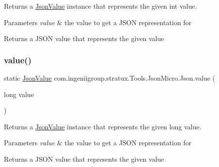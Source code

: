 Returns a \hyperlink{classcom_1_1ingeniigroup_1_1stratux_1_1_tools_1_1_json_micro_1_1_json_value}{Json\+Value} instance that represents the given {\ttfamily int} value.


\begin{DoxyParams}{Parameters}
{\em value} & the value to get a J\+S\+ON representation for \\
\hline
\end{DoxyParams}
\begin{DoxyReturn}{Returns}
a J\+S\+ON value that represents the given value 
\end{DoxyReturn}
\mbox{\label{classcom_1_1ingeniigroup_1_1stratux_1_1_tools_1_1_json_micro_1_1_json_af2c5388580e7dc541af4a3ca8e1a86f2}} 
\subsubsection{\texorpdfstring{value()}{value()}\hspace{0.1cm}{\footnotesize\ttfamily [2/6]}}
{\footnotesize\ttfamily static \hyperlink{classcom_1_1ingeniigroup_1_1stratux_1_1_tools_1_1_json_micro_1_1_json_value}{Json\+Value} com.\+ingeniigroup.\+stratux.\+Tools.\+Json\+Micro.\+Json.\+value (\begin{DoxyParamCaption}\item[{long}]{value }\end{DoxyParamCaption})\hspace{0.3cm}{\ttfamily [static]}}

Returns a \hyperlink{classcom_1_1ingeniigroup_1_1stratux_1_1_tools_1_1_json_micro_1_1_json_value}{Json\+Value} instance that represents the given {\ttfamily long} value.


\begin{DoxyParams}{Parameters}
{\em value} & the value to get a J\+S\+ON representation for \\
\hline
\end{DoxyParams}
\begin{DoxyReturn}{Returns}
a J\+S\+ON value that represents the given value 
\end{DoxyReturn}
\mbox{\label{classcom_1_1ingeniigroup_1_1stratux_1_1_tools_1_1_json_micro_1_1_json_af7f208fc087bc3e4fa605da2c7aa28fd}} 
